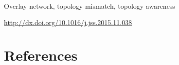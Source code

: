 \documentclass[final,5p,times,twocolumn,authoryear]{elsarticle}
\begin{document}
\begin{frontmatter}



\begin{abstract}

\end{abstract}

\begin{keyword}
Overlay network, topology mismatch, topology awareness




\vspace*{0.2cm}
\centerline{\scriptsize\url{http://dx.doi.org/10.1016/j.jss.2015.11.038}}

\end{keyword}
\end{frontmatter}




\baselineskip





\baselineskip








\section{References}

 






\end{document}
